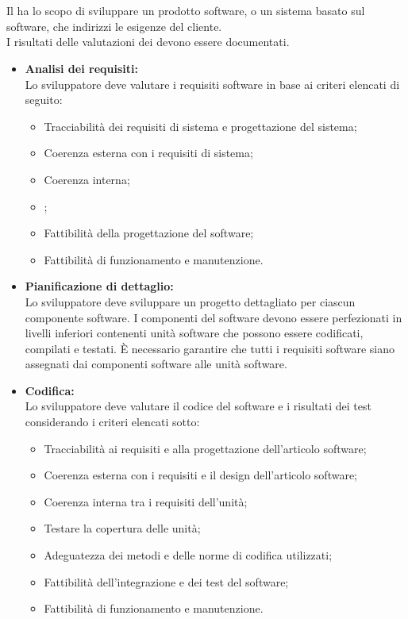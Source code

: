 \mbox{} \\ \\
Il  ha lo scopo di sviluppare un prodotto software, o un sistema basato sul software, che indirizzi le esigenze del cliente. \\
I risultati delle valutazioni dei  devono essere documentati.
\begin{itemize}
    \item \textbf{Analisi dei requisiti:} \\
    Lo sviluppatore deve valutare i requisiti software in base ai criteri elencati di seguito:
        \begin{itemize}
            \item Tracciabilità dei requisiti di sistema e progettazione del sistema;
            \item Coerenza esterna con i requisiti di sistema;
            \item Coerenza interna;
            \item {};
            \item Fattibilità della progettazione del software;
            \item Fattibilità di funzionamento e manutenzione.
        \end{itemize}
    \item \textbf{Pianificazione di dettaglio:} \\
    Lo sviluppatore deve sviluppare un progetto dettagliato per ciascun componente software. I componenti del software 
    devono essere perfezionati in livelli inferiori contenenti unità software che possono essere codificati, compilati 
    e testati. È necessario garantire che tutti i requisiti software siano assegnati dai componenti software 
    alle unità software.
    
    \item \textbf{Codifica:} \\
    Lo sviluppatore deve valutare il codice del software e i risultati dei test considerando i criteri elencati sotto:
    \begin{itemize}
        \item Tracciabilità ai requisiti e alla progettazione dell'articolo software;
        \item Coerenza esterna con i requisiti e il design dell'articolo software;
        \item Coerenza interna tra i requisiti dell'unità;
        \item Testare la copertura delle unità;
        \item Adeguatezza dei metodi e delle norme di codifica utilizzati;
        \item Fattibilità dell'integrazione e dei test del software;
        \item Fattibilità di funzionamento e manutenzione.   
    \end{itemize}
\end{itemize}

